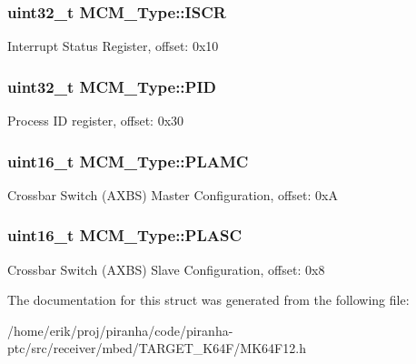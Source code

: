 \subsubsection[{\texorpdfstring{I\+S\+CR}{ISCR}}]{ uint32\+\_\+t M\+C\+M\+\_\+\+Type\+::\+I\+S\+CR}\hypertarget{structMCM__Type_ad05a8c7768c98a628dc1f659deba7d5c}{}\label{structMCM__Type_ad05a8c7768c98a628dc1f659deba7d5c}
Interrupt Status Register, offset\+: 0x10 
\subsubsection[{\texorpdfstring{P\+ID}{PID}}]{ uint32\+\_\+t M\+C\+M\+\_\+\+Type\+::\+P\+ID}\hypertarget{structMCM__Type_ad3902a699f1593becfab73adbd8e506a}{}\label{structMCM__Type_ad3902a699f1593becfab73adbd8e506a}
Process ID register, offset\+: 0x30 
\subsubsection[{\texorpdfstring{P\+L\+A\+MC}{PLAMC}}]{ uint16\+\_\+t M\+C\+M\+\_\+\+Type\+::\+P\+L\+A\+MC}\hypertarget{structMCM__Type_a21b4db9fd3a7335e135c8bf0be800b92}{}\label{structMCM__Type_a21b4db9fd3a7335e135c8bf0be800b92}
Crossbar Switch (A\+X\+BS) Master Configuration, offset\+: 0xA 
\subsubsection[{\texorpdfstring{P\+L\+A\+SC}{PLASC}}]{ uint16\+\_\+t M\+C\+M\+\_\+\+Type\+::\+P\+L\+A\+SC}\hypertarget{structMCM__Type_a7e83a4220c2fc40542aa700b6a98df41}{}\label{structMCM__Type_a7e83a4220c2fc40542aa700b6a98df41}
Crossbar Switch (A\+X\+BS) Slave Configuration, offset\+: 0x8 

The documentation for this struct was generated from the following file\+:\begin{DoxyCompactItemize}
\item 
/home/erik/proj/piranha/code/piranha-\/ptc/src/receiver/mbed/\+T\+A\+R\+G\+E\+T\+\_\+\+K64\+F/M\+K64\+F12.\+h\end{DoxyCompactItemize}
